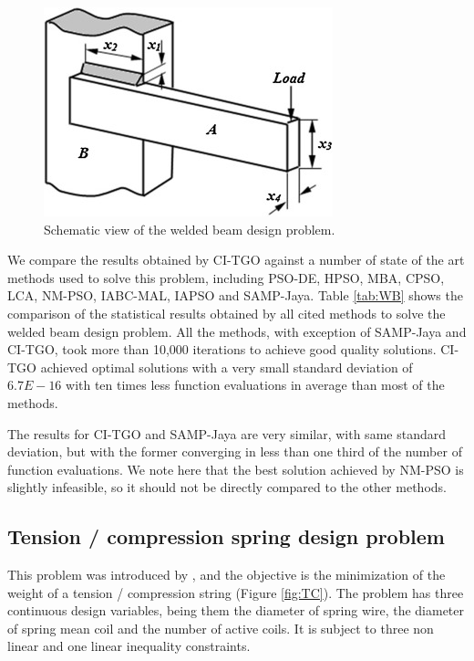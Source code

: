 \begin{figure}[h]
\begin{center}
\includegraphics[scale=0.7]{Imgs/WB.jpg}
\end{center}
\captionsetup{justification=centering}
\caption{Schematic view of the welded beam design problem.}\label{fig:WB}
\end{figure}

We compare the results obtained by CI-TGO against a number of state of the art methods used to solve this problem, including PSO-DE, HPSO, MBA, CPSO, LCA, NM-PSO, IABC-MAL, IAPSO and SAMP-Jaya. Table \ref{tab:WB} shows the comparison of the statistical results obtained by all cited methods to solve the welded beam design problem. All the methods, with exception of SAMP-Jaya and CI-TGO, took more than 10,000 iterations to achieve good quality solutions. CI-TGO achieved optimal solutions with a very small standard deviation of $6.7E \!-\! 16$ with ten times less function evaluations in average than most of the methods.



The results for CI-TGO and SAMP-Jaya are very similar, with same standard deviation, but with the former converging in less than one third of the number of function evaluations. We note here that the best solution achieved by NM-PSO is slightly infeasible, so it should not be directly compared to the other methods.




\subsection{Tension / compression spring design problem}

This problem was introduced by \cite{TC}, and the objective is the minimization of the weight of a tension / compression string (Figure \ref{fig:TC}). The problem has three continuous design variables, being them the diameter of spring wire, the diameter of spring mean coil and the number of active coils. It is subject to three non linear and one linear inequality constraints.

